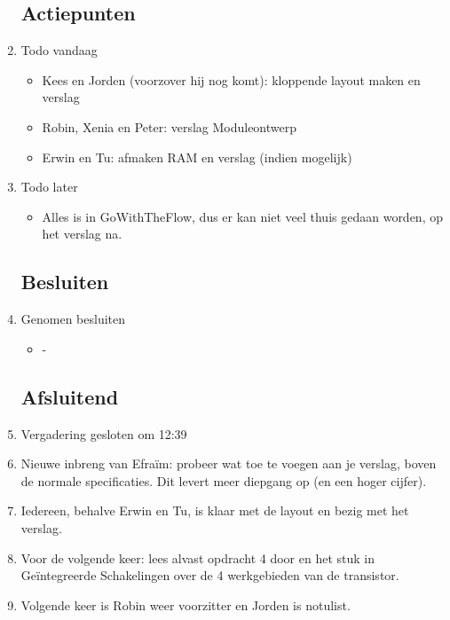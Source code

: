 \documentclass{article}
\begin{document}
\begin{enumerate}
	\subsection*{Actiepunten}
	\item Todo vandaag
	\begin{itemize}
		\item Kees en Jorden (voorzover hij nog komt): kloppende layout maken en verslag
		\item Robin, Xenia en Peter: verslag Moduleontwerp
		\item Erwin en Tu: afmaken RAM en verslag (indien mogelijk)
	\end{itemize}
	\item Todo later
	\begin{itemize}
		\item Alles is in GoWithTheFlow, dus er kan niet veel thuis gedaan worden, op het verslag na. 
	\end{itemize}

	\subsection*{Besluiten}
	\item Genomen besluiten
	\begin{itemize}
		\item-
	\end{itemize}

	\noindent 
	\subsection*{Afsluitend}
	\item Vergadering gesloten om 12:39%
	\item Nieuwe inbreng van Efraïm: probeer wat toe te voegen aan je verslag, boven de normale specificaties. Dit levert meer diepgang op (en een hoger cijfer). 
	\item Iedereen, behalve Erwin en Tu, is klaar met de layout en bezig met het verslag. 
	\item Voor de volgende keer: lees alvast opdracht 4 door en het stuk in Geïntegreerde Schakelingen over de 4 werkgebieden van de transistor.
	\item Volgende keer is Robin weer voorzitter en Jorden is notulist. 

\end{enumerate}
\end{document}
